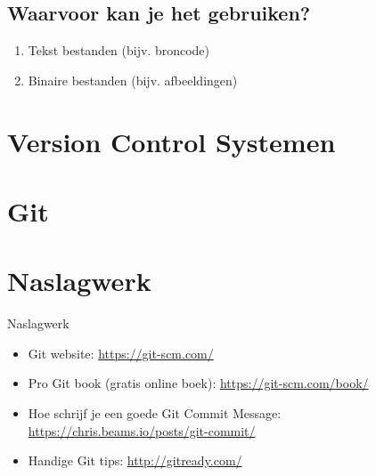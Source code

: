 \documentclass[]{beamer}
\begin{document}
\subsection{Waarvoor kan je het gebruiken?}

\begin{frame}
    \begin{enumerate}
    \item Tekst bestanden (bijv. broncode)
    \item Binaire bestanden (bijv. afbeeldingen)
    \end{enumerate}
\end{frame}

\section{Version Control Systemen}
\section{Git}

\section*{Naslagwerk}

\begin{frame}{Naslagwerk}
    \begin{itemize}
    \item Git website: \url{https://git-scm.com/}
    \item Pro Git book (gratis online boek): \url{https://git-scm.com/book/}
    \item Hoe schrijf je een goede Git Commit Message: \url{https://chris.beams.io/posts/git-commit/}
    \item Handige Git tips: \url{http://gitready.com/}
    \end{itemize}
\end{frame}
\end{document}
